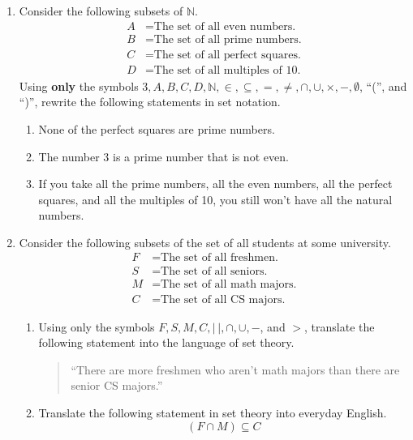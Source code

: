 \documentclass{article}
\newcommand{\N}{\mathbb{N}}
\theoremstyle{definition}
\begin{document}
\begin{question}{5}
   \begin{enumerate}
   \item Consider the following subsets of $\N$.
       \begin{align*}
           A &= \text{The set of all even numbers.}\\
           B &= \text{The set of all prime numbers.}\\
           C &= \text{The set of all perfect squares.}\\
           D &= \text{The set of all multiples of 10.}
       \end{align*}
       Using \textbf{only} the symbols $3, A, B, C, D, \N, \in, \subseteq, =, \neq, \cap, \cup, \times, -, \emptyset$, ``('', and  ``)'', rewrite the following statements in set notation. 
           \begin{enumerate}
               \item None of the perfect squares are prime numbers. 
               \item The number 3 is a prime number that is not even.
               \item If you take all the prime numbers, all the even numbers, all the perfect squares, and all the multiples of 10, you still won't have all the natural numbers.
           \end{enumerate}
   
   \item Consider the following subsets of the set of all students at some university. 
       \begin{align*}
           F &= \text{The set of all freshmen.}\\
           S &= \text{The set of all seniors.}\\
           M &= \text{The set of all math majors.}\\
           C &= \text{The set of all CS majors.}
       \end{align*}
           \begin{enumerate}
               \item Using only the symbols $F, S, M, C, | ~ |, \cap, \cup, -$, and $>$, translate the following statement into the language of set theory. 
               \begin{quote}
                   ``There are more freshmen who aren't math majors than there are senior CS majors.''
               \end{quote}
               \item Translate the following statement in set theory into everyday English. 
               $$(F\cap M)\subseteq C$$
           \end{enumerate}
   \end{enumerate}
\end{question}
\end{document}
